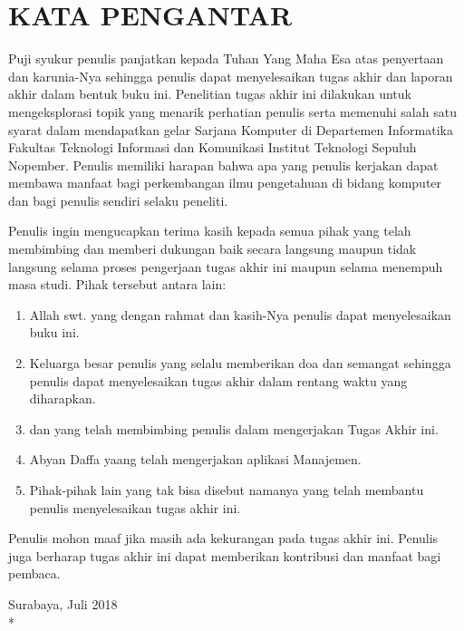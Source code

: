 \chapter {KATA PENGANTAR}

Puji syukur penulis panjatkan kepada Tuhan Yang Maha Esa atas penyertaan dan karunia-Nya sehingga penulis dapat menyelesaikan tugas akhir dan laporan akhir dalam bentuk buku ini. Penelitian tugas akhir ini dilakukan untuk mengeksplorasi topik yang menarik perhatian penulis serta memenuhi salah satu syarat dalam mendapatkan gelar Sarjana Komputer di Departemen Informatika Fakultas Teknologi Informasi dan Komunikasi Institut Teknologi Sepuluh Nopember. Penulis memiliki harapan bahwa apa yang penulis kerjakan dapat membawa manfaat bagi perkembangan ilmu pengetahuan di bidang komputer dan bagi penulis sendiri selaku peneliti.

Penulis ingin mengucapkan terima kasih kepada semua pihak yang telah membimbing dan memberi dukungan baik secara langsung maupun tidak langsung selama proses pengerjaan tugas akhir ini maupun selama menempuh masa studi. Pihak tersebut antara lain:

\begin {enumerate}
	\item Allah swt. yang dengan rahmat dan kasih-Nya penulis dapat menyelesaikan buku ini.
    \item Keluarga besar penulis yang selalu memberikan doa dan semangat sehingga penulis dapat menyelesaikan tugas akhir dalam rentang waktu yang diharapkan. 
    \item \pembimbingsatu dan \pembimbingdua yang telah membimbing penulis dalam mengerjakan Tugas Akhir ini.
    \item Abyan Daffa yaang telah mengerjakan aplikasi Manajemen.
    \item Pihak-pihak lain yang tak bisa disebut namanya yang telah membantu penulis menyelesaikan tugas akhir ini.
\end {enumerate}

Penulis mohon maaf jika masih ada kekurangan pada tugas akhir ini. Penulis juga berharap tugas akhir ini dapat memberikan kontribusi dan manfaat bagi pembaca.

\begin{flushright}
Surabaya, Juli 2018 \\*
\vspace{5em}
\penulis
\end{flushright}